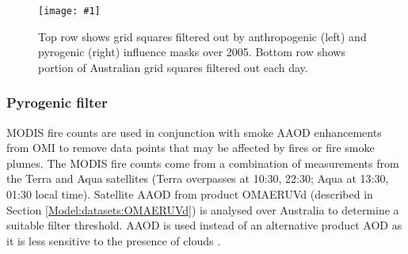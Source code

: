 \documentclass[acp, manuscript]{copernicus}
\newcommand{\parencite}{\citep}
\newcommand{\textcite}{\citet}
\newcommand{\mypic}[3]{%
  \begin{figure}
    \texttt{[image: \#1]}
    \caption{#2}
    #3
  \end{figure}
}
\begin{document}
    
    
    \mypic{Figures/Filters/AnthroPyroFilters_2005.png}{%
      Top row shows grid squares filtered out by anthropogenic (left) and pyrogenic (right) influence masks over 2005.
      Bottom row shows portion of Australian grid squares filtered out each day. 
    }{\label{Model:filter:fig_anthropyrofilters}}
    
    
    \subsubsection{Pyrogenic filter}
    \label{Model:filter:fire}
    
    MODIS fire counts are used in conjunction with smoke AAOD enhancements from OMI to remove data points that may be affected by fires or fire smoke plumes.
    The MODIS fire counts come from a combination of measurements from the Terra and Aqua satellites (Terra overpasses at 10:30, 22:30; Aqua at 13:30, 01:30 local time).
    Satellite AAOD from product OMAERUVd (described in Section \ref{Model:datasets:OMAERUVd}) is analysed over Australia to determine a suitable filter threshold.
    AAOD is used instead of an alternative product AOD as it is less sensitive to the presence of clouds \parencite{Ahn2008}.
    
\end{document}
